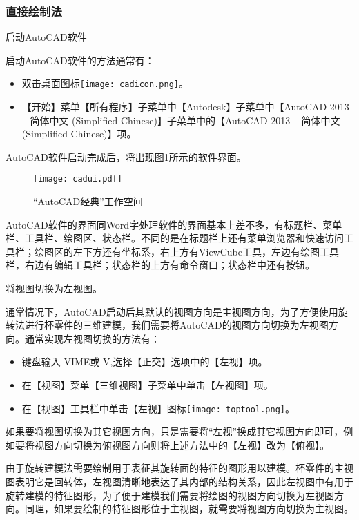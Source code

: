 \subsubsection{直接绘制法}\label{sec:beilingjianleft}
\begin{procedure}

\item 启动AutoCAD软件

启动AutoCAD软件的方法通常有：
\begin{itemize}
\item 双击桌面图标\texttt{[image: cadicon.png]}。
\item 【开始】菜单【所有程序】子菜单中【Autodesk】子菜单中【AutoCAD 2013 – 简体中文 (Simplified Chinese)】子菜单中的【AutoCAD 2013 – 简体中文 (Simplified Chinese)】项。
\end{itemize}
AutoCAD软件启动完成后，将出现图\ref{fig:cadui}所示的软件界面。
\noindent
\begin{figure}[htbp]
\centering
\texttt{[image: cadui.pdf]}
\caption{“AutoCAD经典”工作空间}\label{fig:cadui}
\end{figure}
AutoCAD软件的界面同Word字处理软件的界面基本上差不多，有标题栏、菜单栏、工具栏、绘图区、状态栏。不同的是在标题栏上还有菜单浏览器和快速访问工具栏；绘图区的左下方还有坐标系，右上方有ViewCube工具，左边有绘图工具栏，右边有编辑工具栏；状态栏的上方有命令窗口；状态栏中还有按钮。

\item 将视图切换为左视图。

通常情况下，AutoCAD启动后其默认的视图方向是主视图方向，为了方便使用旋转法进行杯零件的三维建模，我们需要将AutoCAD的视图方向切换为左视图方向。通常实现左视图切换的方法有：
\begin{itemize}
\item 键盘输入-VIME或-V,选择【正交】选项中的【左视】项。
\item 在【视图】菜单【三维视图】子菜单中单击【左视图】项。
\item 在【视图】工具栏中单击【左视】图标\texttt{[image: toptool.png]}。
\end{itemize}
如果要将视图切换为其它视图方向，只是需要将“左视”换成其它视图方向即可，例如要将视图方向切换为俯视图方向则将上述方法中的【左视】改为【俯视】。

由于旋转建模法需要绘制用于表征其旋转面的特征的图形用以建模。杯零件的主视图表明它是回转体，左视图清晰地表达了其内部的结构关系，因此左视图中有用于旋转建模的特征图形，为了便于建模我们需要将绘图的视图方向切换为左视图方向。同理，如果要绘制的特征图形位于主视图，就需要将视图方向切换为主视图。


\end{procedure}
